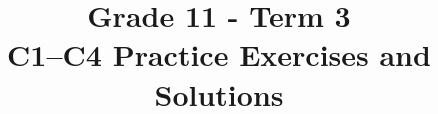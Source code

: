 \makeatletter
{}
\makeatother







\title{Grade 11 - Term 3 \\ C1--C4 Practice Exercises and Solutions}
\author{}
\date{}


\newcommand{\SolvedGraph}[2]{%
	\par\smallskip
	\Needspace{4.6cm}%
	\begin{center}
		\textbf{\small #1}\par\vspace{-1mm}
		\resizebox{0.39\textwidth}{!}{%
			\begin{minipage}{10cm}
				#2
			\end{minipage}%
		}
	\end{center}
	\vspace{-2mm}%
}

\newcommand{\SolutionStage}[2]{%
	\Needspace{6\baselineskip}%
	\subsection{#2}%
}


	\maketitle
	\vspace{-2cm}
	\setcounter{tocdepth}{1}
	\setcounter{secnumdepth}{2}
	\label{toc}
	\tableofcontents

	
